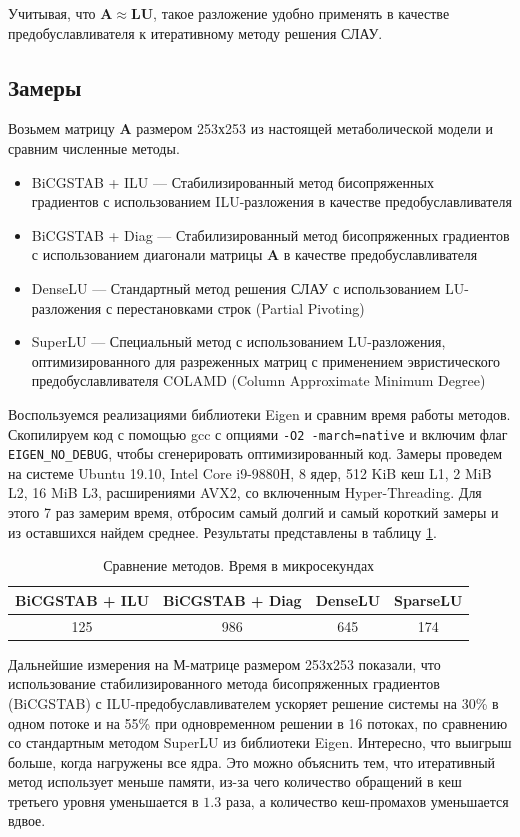 \documentclass[14pt, a4paper]{extreport}
\begin{document}
Учитывая, что $\mathbf{A} \approx \mathbf{LU}$, такое разложение удобно применять в качестве предобуславливателя к итеративному методу решения СЛАУ.

\clearpage
\subsection{Замеры}
Возьмем матрицу $\mathbf{A}$ размером 253х253 из настоящей метаболической модели и сравним численные методы. 
\begin{itemize}
	\item BiCGSTAB + ILU --- Стабилизированный метод бисопряженных\\градиентов\cite{BiCGSTAB} с использованием ILU-разложения в качестве предобуславливателя
	\item BiCGSTAB + Diag --- Стабилизированный метод бисопряженных градиентов с использованием диагонали матрицы $\mathbf{A}$ в качестве предобуславливателя
	\item DenseLU --- Стандартный метод решения СЛАУ с использованием LU-разложения с перестановками строк (Partial Pivoting)
	\item SuperLU --- Специальный метод с использованием LU-разложения, оптимизированного для разреженных матриц\cite{SuperLU} с применением эвристического предобуславливателя COLAMD (Column Approximate Minimum Degree)\cite{COLAMD}
\end{itemize}
Воспользуемся реализациями библиотеки Eigen и сравним время работы методов. Скопилируем код с помощью gcc с опциями \texttt{-O2 -march=native} и включим флаг \texttt{EIGEN\_NO\_DEBUG}, чтобы сгенерировать оптимизированный код. Замеры проведем на системе Ubuntu 19.10, Intel Core i9-9880H, 8 ядер, 512 KiB кеш L1, 2 MiB L2, 16 MiB L3, расширениями AVX2, со включенным Hyper-Threading. Для этого 7 раз замерим время, отбросим самый долгий и самый короткий замеры и из оставшихся найдем среднее. Результаты представлены в таблицу \ref{methods_benchmark}.

\begin{table}[b]
	\centering
	\caption{Сравнение методов. Время в микросекундах\label{methods_benchmark}}
	\begin{tabular}{c|c|c|c}
		\hline
		BiCGSTAB + ILU & BiCGSTAB + Diag & DenseLU & SparseLU\\
		\hline
		125 & 986 & 645 & 174\\
	\end{tabular}
\end{table}

Дальнейшие измерения на М-матрице размером 253х253 показали, что использование стабилизированного метода бисопряженных градиентов\\(BiCGSTAB) с ILU-предобуславливателем ускоряет решение системы на 30\% в одном потоке и на 55\% при одновременном решении в 16 потоках, по сравнению со стандартным методом SuperLU из библиотеки Eigen. Интересно, что выигрыш больше, когда нагружены все ядра. Это можно объяснить тем, что итеративный метод использует меньше памяти, из-за чего количество обращений в кеш третьего уровня уменьшается в $1.3$ раза, а количество кеш-промахов уменьшается вдвое. 
\end{document}
